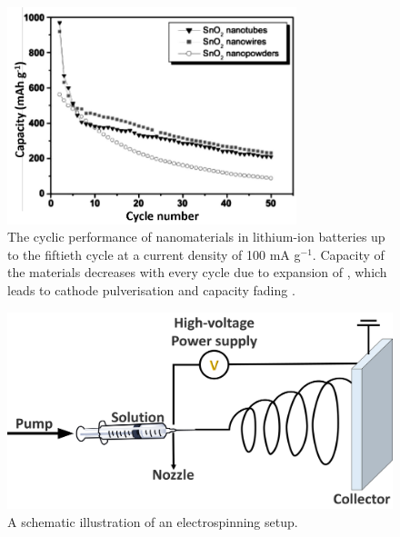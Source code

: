 \begin{figure}[th!]
\centering
\includegraphics[width=0.75\textwidth]{Figures/chap6fig/sno2pap.pdf}
\caption{The cyclic performance of  nanomaterials in lithium-ion batteries up to the fiftieth cycle at a current density of 100 mA g$^{-1}$. Capacity of the materials decreases with every cycle due to expansion of , which leads to cathode pulverisation and capacity fading \cite{park_effect_2008}.}
\label{Figures/chap6fig:sno2pap}
\end{figure}
\begin{figure}[th!]
\centering
\includegraphics[width=\textwidth]{Figures/chap6fig/electrospinning}
\caption{A schematic illustration of an electrospinning setup.}
\label{Figures/chap6fig:electrospinning}
\end{figure}
